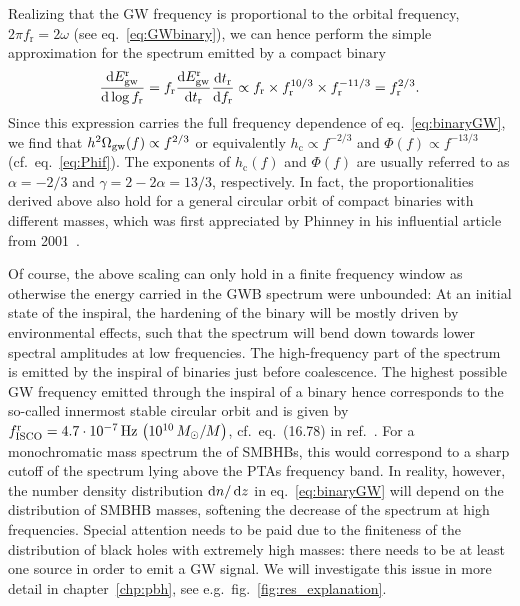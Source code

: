 Realizing that the \ac{GW} frequency is proportional to the orbital frequency, $2 \pi f_\text{r} = 2 \omega$ (see eq.~\ref{eq:GWbinary}), we can hence perform the simple approximation for the spectrum emitted by a compact binary 
\begin{align}
	\frac{\mathrm d E_{\text{gw}}^\text{r}}{\mathrm d \log f_\text{r}} = f_\text{r} \frac{\mathrm d E_{\text{gw}}^\text{r}}{\mathrm d t_\text{r}} \frac{\mathrm d t_\text{r}}{\mathrm d f_\text{r}} \propto f_\text{r} \times f_\text{r}^{10/3} \times f_\text{r}^{-11/3} = f_\text{r}^{2/3} . \label{eq:13/3}
\end{align}
Since this expression carries the full frequency dependence of eq.~\eqref{eq:binaryGW}, we find that $h^2 \Omega_{\text{gw}}(f) \propto f^{2/3}$ or equivalently $h_\text{c} \propto f^{-2/3}$ and $\Phi(f) \propto f^{-13/3}$ (cf.~eq.~\eqref{eq:Phif}). The exponents of $h_\text{c}(f)$ and $\Phi(f)$ are usually referred to as $\alpha = -2/3$ and $\gamma = 2-2\alpha = 13/3$, respectively.  In fact, the proportionalities derived above also hold  for a general circular orbit of compact binaries with different masses, which was first appreciated by Phinney in his influential article from 2001~\cite{Phinney:2001di}.

Of course, the above scaling can only hold in a finite frequency window as otherwise the energy carried in the \ac{GWB} spectrum were unbounded: At an initial state of the inspiral, the hardening of the binary will be mostly driven by environmental effects, such that the spectrum will bend down towards lower spectral amplitudes at low frequencies. The high-frequency part of the spectrum is emitted by the inspiral of binaries just before coalescence. The  highest possible \ac{GW} frequency emitted through the inspiral of a binary hence corresponds to the so-called innermost stable circular orbit and is given by
$f_\text{ISCO}^\text{r} = 4.7 \cdot 10^{-7} \, \text{Hz} \, \left( 10^{10} \, M_\odot / M  \right)$, cf.~eq.~(16.78) in ref.~\cite{Maggiore:2018sht}. For a monochromatic mass spectrum the of \acp{SMBHB}, this would correspond to a sharp cutoff of the spectrum lying above the \acp{PTA} frequency band. In reality, however, the number density distribution $\mathop{}\!\mathrm{d} n / \mathop{}\!\mathrm{d} z$ in eq.~\eqref{eq:binaryGW} will depend on the distribution of \ac{SMBHB} masses, softening the decrease of the spectrum at high frequencies. Special attention needs to be paid due to the finiteness of the distribution of black holes with extremely high masses: there needs to be at least one source in order to emit a \ac{GW} signal. We will investigate this issue in more detail in chapter~\ref{chp:pbh}, see e.g.~fig.~\ref{fig:res_explanation}.

